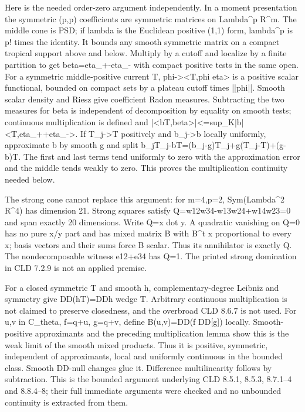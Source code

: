 \documentclass[11pt]{article}
\begin{document}
Here is the needed order-zero argument independently. In a moment presentation the symmetric (p,p) coefficients are symmetric matrices on Lambda\textasciicircum{}p R\textasciicircum{}m. The middle cone is PSD; if lambda is the Euclidean positive (1,1) form, lambda\textasciicircum{}p is p! times the identity. It bounds any smooth symmetric matrix on a compact tropical support above and below. Multiply by a cutoff and localize by a finite partition to get beta=eta\_+-eta\_- with compact positive tests in the same open. For a symmetric middle-positive current T, phi-><T,phi eta> is a positive scalar functional, bounded on compact sets by a plateau cutoff times ||phi||. Smooth scalar density and Riesz give coefficient Radon measures. Subtracting the two measures for beta is independent of decomposition by equality on smooth tests; continuous multiplication is defined and |<bT,beta>|<=sup\_K|b|<T,eta\_++eta\_->. If T\_j->T positively and b\_j->b locally uniformly, approximate b by smooth g and split b\_jT\_j-bT=(b\_j-g)T\_j+g(T\_j-T)+(g-b)T. The first and last terms tend uniformly to zero with the approximation error and the middle tends weakly to zero. This proves the multiplication continuity needed below.

The strong cone cannot replace this argument: for m=4,p=2, Sym(Lambda\textasciicircum{}2 R\textasciicircum{}4) has dimension 21. Strong squares satisfy Q=w12w34-w13w24+w14w23=0 and span exactly 20 dimensions. Write Q=x dot y. A quadratic vanishing on Q=0 has no pure x/y part and has mixed matrix B with B\textasciicircum{}t x proportional to every x; basis vectors and their sums force B scalar. Thus its annihilator is exactly Q. The nondecomposable witness e12+e34 has Q=1. The printed strong domination in CLD 7.2.9 is not an applied premise.

For a closed symmetric T and smooth h, complementary-degree Leibniz and symmetry give DD(hT)=DDh wedge T. Arbitrary continuous multiplication is not claimed to preserve closedness, and the overbroad CLD 8.6.7 is not used. For u,v in C\_theta, f=q+u, g=q+v, define B(u,v)=DD(f DD[g]) locally. Smooth-positive approximants and the preceding multiplication lemma show this is the weak limit of the smooth mixed products. Thus it is positive, symmetric, independent of approximants, local and uniformly continuous in the bounded class. Smooth DD-null changes glue it. Difference multilinearity follows by subtraction. This is the bounded argument underlying CLD 8.5.1, 8.5.3, 8.7.1--4 and 8.8.4--8; their full immediate arguments were checked and no unbounded continuity is extracted from them.
\end{document}
